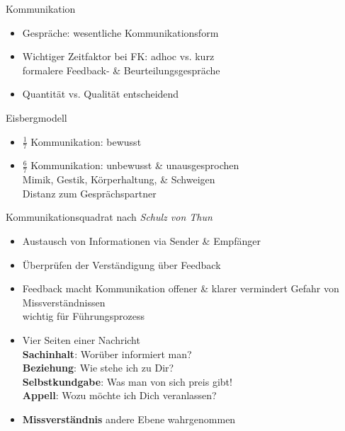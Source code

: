 \documentclass{cheatsheet}
\begin{document}
    \begin{sectionbox}{Kommunikation}
        \begin{itemize}
            \item Gespräche: wesentliche Kommunikationsform
            \item Wichtiger Zeitfaktor bei FK: adhoc vs. kurz\\
            \ra formalere Feedback- \& Beurteilungsgespräche
            \item Quantität vs. Qualität entscheidend
        \end{itemize}
    \end{sectionbox}
    \begin{warningbox}{Eisbergmodell}
        \begin{itemize}
            \item $\frac{1}{7}$ Kommunikation: bewusst
            \item $\frac{6}{7}$ Kommunikation: unbewusst \& unausgesprochen\\
            \ra Mimik, Gestik, Körperhaltung, \& Schweigen\\
            \ra Distanz zum Gesprächspartner
        \end{itemize}
    \end{warningbox}
    \begin{warningbox}{Kommunikationsquadrat nach \emph{Schulz von Thun}}
        \begin{itemize}
            \item Austausch von Informationen via Sender \& Empfänger\\
            \item Überprüfen der Verständigung über Feedback
            \item Feedback macht Kommunikation offener \& klarer
            \ra vermindert Gefahr von Missverständnissen\\
            \ra wichtig für Führungsprozess
            \item Vier Seiten einer Nachricht\\
            \ra \textbf{Sachinhalt}: Worüber informiert man?\\
            \ra \textbf{Beziehung}: Wie stehe ich zu Dir?\\
            \ra \textbf{Selbstkundgabe}: Was man von sich preis gibt!\\
            \ra \textbf{Appell}: Wozu möchte ich Dich veranlassen?
            \item \textbf{Missverständnis} \ra andere Ebene wahrgenommen
        \end{itemize}
    \end{warningbox}
\end{document}

